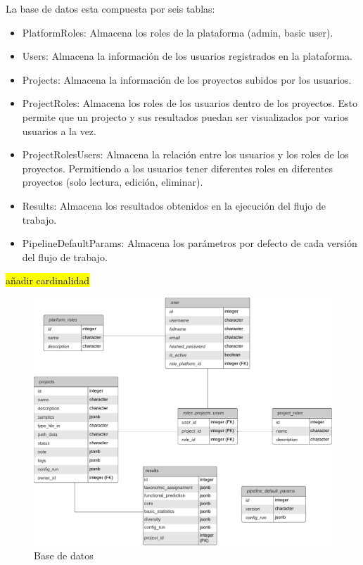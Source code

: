 La base de datos esta compuesta por seis tablas:
\begin{itemize}
    \item PlatformRoles: Almacena los roles de la plataforma (admin, basic user).
    \item Users: Almacena la información de los usuarios registrados en la plataforma.
    \item Projects: Almacena la información de los proyectos subidos por los usuarios.
    \item ProjectRoles: Almacena los roles de los usuarios dentro de los proyectos. Esto permite que un projecto y sus resultados puedan ser visualizados por varios usuarios a la vez.
    \item ProjectRolesUsers: Almacena la relación entre los usuarios y los roles de los proyectos. Permitiendo a los usuarios tener diferentes roles en diferentes proyectos (solo lectura, edición, eliminar).
    \item Results: Almacena los resultados obtenidos en la ejecución del flujo de trabajo.
    \item PipelineDefaultParams: Almacena los parámetros por defecto de cada versión del flujo de trabajo.
\end{itemize}
\hl{añadir cardinalidad}
\begin{figure}[H]
    \centering
    \includegraphics[width=1\linewidth]{images/nanotax-db.pdf}
    \caption{Base de datos}
    \label{fig:nanotax-db}
\end{figure}

